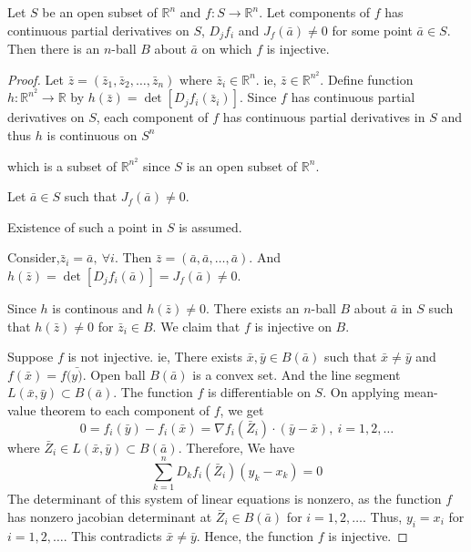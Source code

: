 \begin{theorem}
Let $S$ be an open subset of $\mathbb{R}^n$ and $f : S \to \mathbb{R}^n$.
Let components of $f$ has continuous partial derivatives on $S$, $D_jf_i$ and $J_f(\bar{a}) \ne 0$ for some point $\bar{a} \in S$.
Then there is an $n$-ball $B$ about $\bar{a}$ on which $f$ is injective.
\end{theorem}
\begin{proof}
	Let $\bar{z} = (\bar{z}_1,\bar{z}_2,\dots,\bar{z}_n)$ where $\bar{z}_i \in \mathbb{R}^n$.
	ie, $\bar{z} \in \mathbb{R}^{n^2}$.
	Define function $h : \mathbb{R}^{n^2} \to \mathbb{R}$ by $h(\bar{z}) = \det{[D_jf_i(\bar{z}_i)]}$.
	Since $f$ has continuous partial derivatives on $S$, each component of $f$ has continuous partial derivatives in $S$ and thus $h$ is continuous on $S^n$ 
\begin{commentary} 
	which is a subset of $\mathbb{R}^{n^2}$ since $S$ is an open subset of $\mathbb{R}^n$.
\end{commentary}

	Let $\bar{a} \in S$ such that $J_f(\bar{a}) \ne 0$.
\begin{commentary}
	Existence of such a point in $S$ is assumed.
\end{commentary}
	Consider,$\bar{z}_i = \bar{a},\ \forall i$.
	Then $\bar{z} = (\bar{a},\bar{a},\dots,\bar{a})$.
	And $h(\bar{z}) = \det{[D_jf_i(\bar{a})]} = J_f(\bar{a}) \ne 0$.

	Since $h$ is continous and $h(\bar{z}) \ne 0$.
	There exists an $n$-ball $B$ about $\bar{a}$ in $S$ such that $h(\bar{z}) \ne 0$ for $\bar{z}_i \in B$.
	We claim that $f$ is injective on $B$.

	Suppose $f$ is not injective.
	ie, There exists $\bar{x},\bar{y} \in B(\bar{a})$ such that $\bar{x} \ne \bar{y}$ and $f(\bar{x}) = f(\bar{y)}$.
	Open ball $B(\bar{a})$ is a convex set.
	And the line segment $L(\bar{x},\bar{y}) \subset B(\bar{a})$.
	The function $f$ is differentiable on $S$.
	On applying mean-value theorem to each component of $f$, we get
	\[ 0 = f_i(\bar{y})-f_i(\bar{x}) = \nabla f_i(\bar{Z}_i)\cdot(\bar{y}-\bar{x}),\ i=1,2,\dotsc \]
	where $\bar{Z}_i \in L(\bar{x},\bar{y}) \subset B(\bar{a})$.
	Therefore, We have
	\[ \sum_{k=1}^n D_kf_i(\bar{Z}_i)(y_k-x_k) = 0 \]
	The determinant of this system of linear equations is nonzero, as the function $f$ has nonzero jacobian determinant at $\bar{Z}_i \in B(\bar{a})$ for $i = 1,2,\dotsc$.
	Thus, $y_i = x_i$ for $i = 1,2,\dotsc$. This contradicts $\bar{x} \ne \bar{y}$.
	Hence, the function $f$ is injective.
\end{proof}

